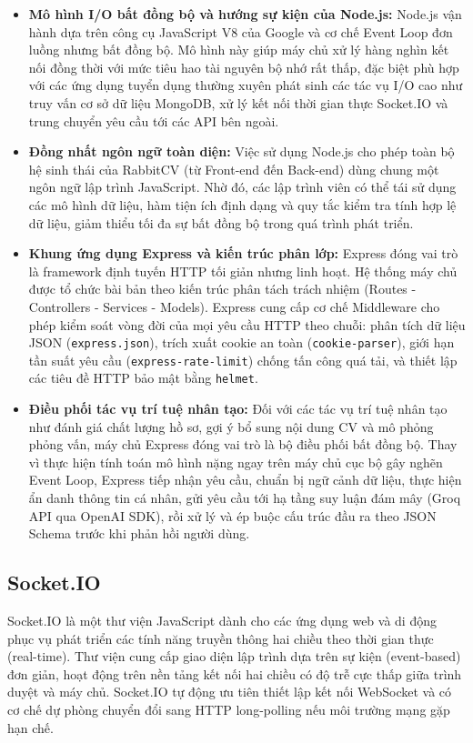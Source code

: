 \begin{itemize}
    \item \textbf{Mô hình I/O bất đồng bộ và hướng sự kiện của Node.js:} Node.js vận hành dựa trên công cụ JavaScript V8 của Google và cơ chế Event Loop đơn luồng nhưng bất đồng bộ. Mô hình này giúp máy chủ xử lý hàng nghìn kết nối đồng thời với mức tiêu hao tài nguyên bộ nhớ rất thấp, đặc biệt phù hợp với các ứng dụng tuyển dụng thường xuyên phát sinh các tác vụ I/O cao như truy vấn cơ sở dữ liệu MongoDB, xử lý kết nối thời gian thực Socket.IO và trung chuyển yêu cầu tới các API bên ngoài.
    \item \textbf{Đồng nhất ngôn ngữ toàn diện:} Việc sử dụng Node.js cho phép toàn bộ hệ sinh thái của RabbitCV (từ Front-end đến Back-end) dùng chung một ngôn ngữ lập trình JavaScript. Nhờ đó, các lập trình viên có thể tái sử dụng các mô hình dữ liệu, hàm tiện ích định dạng và quy tắc kiểm tra tính hợp lệ dữ liệu, giảm thiểu tối đa sự bất đồng bộ trong quá trình phát triển.
    \item \textbf{Khung ứng dụng Express và kiến trúc phân lớp:} Express đóng vai trò là framework định tuyến HTTP tối giản nhưng linh hoạt. Hệ thống máy chủ được tổ chức bài bản theo kiến trúc phân tách trách nhiệm (Routes - Controllers - Services - Models). Express cung cấp cơ chế Middleware cho phép kiểm soát vòng đời của mọi yêu cầu HTTP theo chuỗi: phân tích dữ liệu JSON (\texttt{express.json}), trích xuất cookie an toàn (\texttt{cookie-parser}), giới hạn tần suất yêu cầu (\texttt{express-rate-limit}) chống tấn công quá tải, và thiết lập các tiêu đề HTTP bảo mật bằng \texttt{helmet}.
    \item \textbf{Điều phối tác vụ trí tuệ nhân tạo:} Đối với các tác vụ trí tuệ nhân tạo như đánh giá chất lượng hồ sơ, gợi ý bổ sung nội dung CV và mô phỏng phỏng vấn, máy chủ Express đóng vai trò là bộ điều phối bất đồng bộ. Thay vì thực hiện tính toán mô hình nặng ngay trên máy chủ cục bộ gây nghẽn Event Loop, Express tiếp nhận yêu cầu, chuẩn bị ngữ cảnh dữ liệu, thực hiện ẩn danh thông tin cá nhân, gửi yêu cầu tới hạ tầng suy luận đám mây (Groq API qua OpenAI SDK), rồi xử lý và ép buộc cấu trúc đầu ra theo JSON Schema trước khi phản hồi người dùng.
\end{itemize}

\subsection{Socket.IO}

Socket.IO là một thư viện JavaScript dành cho các ứng dụng web và di động phục vụ phát triển các tính năng truyền thông hai chiều theo thời gian thực (real-time). Thư viện cung cấp giao diện lập trình dựa trên sự kiện (event-based) đơn giản, hoạt động trên nền tảng kết nối hai chiều có độ trễ cực thấp giữa trình duyệt và máy chủ. Socket.IO tự động ưu tiên thiết lập kết nối WebSocket và có cơ chế dự phòng chuyển đổi sang HTTP long-polling nếu môi trường mạng gặp hạn chế.

